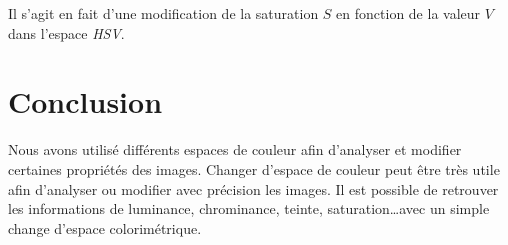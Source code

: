 \documentclass[a4paper,11pt]{article}
\begin{document}
Il s'agit en fait d'une modification de la saturation $S$ en fonction 
de la valeur $V$ dans l'espace \textit{HSV}.

\newpage

\section*{Conclusion}
Nous avons utilisé différents espaces de couleur afin d'analyser et 
modifier certaines propriétés des images. Changer d'espace de couleur 
peut être très utile afin d'analyser ou modifier avec précision 
les images. Il est possible de retrouver les informations 
de luminance, chrominance, teinte, saturation\ldots avec un simple 
change d'espace colorimétrique.  
\end{document}
